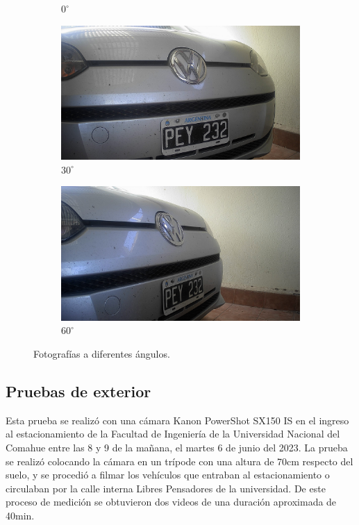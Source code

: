 \begin{figure}[bth]
\begin{subfigure}{.15\textwidth}
        \caption{$0^\circ$}
    \end{subfigure}
    \begin{subfigure}{.15\textwidth}
        \centering
        \includegraphics[width=\textwidth]{imgs/test-angulos/30_50.jpg}
        \caption{$30^\circ$}
    \end{subfigure}
    \begin{subfigure}{.15\textwidth}
        \centering
        \includegraphics[width=\textwidth]{imgs/test-angulos/60_50.jpg}
        \caption{$60^\circ$}
    \end{subfigure}
    \caption{Fotografías a diferentes ángulos.}
    \label{fig:fotos-angulo}
\end{figure}

\subsection{Pruebas de exterior}
Esta prueba se realizó con una cámara Kanon PowerShot SX150 IS \cite{kanon_powershot_nodate} en el ingreso al estacionamiento de la Facultad de Ingeniería de la Universidad Nacional del Comahue entre las 8 y 9 de la mañana, el martes 6 de junio del 2023. La prueba se realizó colocando la cámara en un trípode con una altura de 70cm respecto del suelo, y se procedió a filmar los vehículos que entraban al estacionamiento o circulaban por la calle interna Libres Pensadores de la universidad. De este proceso de medición se obtuvieron dos videos de una duración aproximada de 40min.

